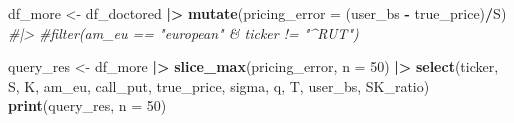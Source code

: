 \documentclass[
]{article}
\newenvironment{Shaded}{\begin{snugshade}}{\end{snugshade}}
\newcommand{\AttributeTok}[1]{\textcolor[rgb]{0.13,0.29,0.53}{#1}}
\newcommand{\CommentTok}[1]{\textcolor[rgb]{0.56,0.35,0.01}{\textit{#1}}}
\newcommand{\DecValTok}[1]{\textcolor[rgb]{0.00,0.00,0.81}{#1}}
\newcommand{\FunctionTok}[1]{\textcolor[rgb]{0.13,0.29,0.53}{\textbf{#1}}}
\newcommand{\NormalTok}[1]{#1}
\newcommand{\OtherTok}[1]{\textcolor[rgb]{0.56,0.35,0.01}{#1}}
\newcommand{\SpecialCharTok}[1]{\textcolor[rgb]{0.81,0.36,0.00}{\textbf{#1}}}
\begin{document}
\begin{Shaded}
\begin{Highlighting}[]
\NormalTok{df\_more }\OtherTok{\textless{}{-}}\NormalTok{ df\_doctored }\SpecialCharTok{|\textgreater{}}
  \FunctionTok{mutate}\NormalTok{(}\AttributeTok{pricing\_error =}\NormalTok{ (user\_bs }\SpecialCharTok{{-}}\NormalTok{ true\_price)}\SpecialCharTok{/}\NormalTok{S) }\CommentTok{\#|\textgreater{}}
  \CommentTok{\#filter(am\_eu == "european" \& ticker != "\^{}RUT")}
\end{Highlighting}
\end{Shaded}

\begin{Shaded}
\begin{Highlighting}[]
\NormalTok{query\_res }\OtherTok{\textless{}{-}}\NormalTok{ df\_more }\SpecialCharTok{|\textgreater{}} \FunctionTok{slice\_max}\NormalTok{(pricing\_error, }\AttributeTok{n =} \DecValTok{50}\NormalTok{) }\SpecialCharTok{|\textgreater{}} \FunctionTok{select}\NormalTok{(ticker, S, K, am\_eu, call\_put, true\_price, sigma, q, T, user\_bs, SK\_ratio)}
\FunctionTok{print}\NormalTok{(query\_res, }\AttributeTok{n =} \DecValTok{50}\NormalTok{)}
\end{Highlighting}
\end{Shaded}
\end{document}
